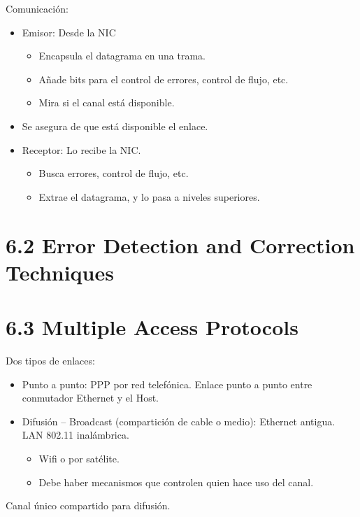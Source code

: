 \documentclass[12pt, twoside, openright]{report} %
\begin{document}
Comunicación:
\begin{itemize}
	\item Emisor: Desde la NIC

	      \begin{itemize}
		      \item Encapsula el datagrama en una trama.
		      \item Añade bits para el control de errores, control de flujo, etc.
		      \item Mira si el canal está disponible.
	      \end{itemize}
	\item Se asegura de que está disponible el enlace.
	\item Receptor: Lo recibe la NIC.

	      \begin{itemize}
		      \item Busca errores, control de flujo, etc.
		      \item Extrae el datagrama, y lo pasa a niveles superiores.
	      \end{itemize}
\end{itemize}


\section{6.2 Error Detection and Correction Techniques}

\section{6.3 Multiple Access Protocols}


Dos tipos de enlaces:

\begin{itemize}
	\item Punto a punto: PPP por red telefónica. Enlace punto a punto entre
	      conmutador Ethernet y el Host.
	\item Difusión -- Broadcast (compartición de cable o medio): Ethernet
	      antigua. LAN 802.11 inalámbrica.

	      \begin{itemize}
		      \item Wifi o por satélite.
		      \item Debe haber mecanismos que controlen quien hace uso del canal.
	      \end{itemize}
\end{itemize}

Canal único compartido para difusión.
\end{document}
